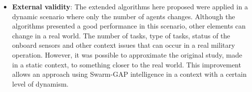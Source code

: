 \begin{itemize}
   \item \textbf{External validity}: The extended algorithms here proposed were applied in a dynamic scenario where only the number of agents changes. Although the algorithms presented a good performance in this scenario, other elements can change in a real world. The number of tasks, type of tasks, status of the onboard sensors and other context issues that can occur in a real military operation. However, it was possible to approximate the original study, made in a static context, to something closer to the real world. This improvement allows an approach using Swarm-GAP intelligence in a context with a certain level of dynamism.
\end{itemize}

